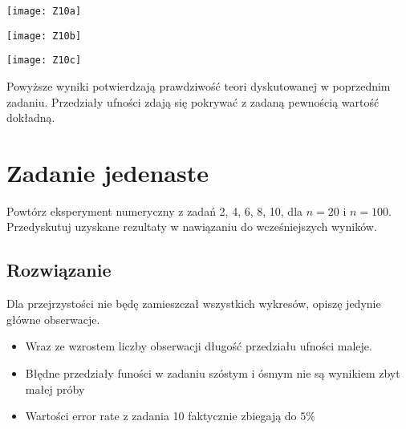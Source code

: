 \documentclass[a4paper]{article}
\begin{document}
\texttt{[image: Z10a]}

\texttt{[image: Z10b]}

\texttt{[image: Z10c]}

Powyższe wyniki potwierdzają prawdziwość teori dyskutowanej w poprzednim zadaniu. Przedziały ufności zdają się pokrywać z zadaną pewnością wartość dokładną.

\section{Zadanie jedenaste}
Powtórz eksperyment numeryczny z zadań 2, 4, 6, 8, 10, dla $n=20$ i $n=100$. Przedyskutuj uzyskane rezultaty w nawiązaniu do wcześniejszych wyników.

\subsection{Rozwiązanie}

Dla przejrzystości nie będę zamieszczał wszystkich wykresów, opiszę jedynie główne obserwacje.
\begin{itemize}
\item Wraz ze wzrostem liczby obserwacji długość przedziału ufności maleje.
\item Błędne przedziały funości w zadaniu szóstym i ósmym nie są wynikiem zbyt małej próby
\item Wartości error rate z zadania 10 faktycznie zbiegają do $5\%$
\end{itemize}
\end{document}
